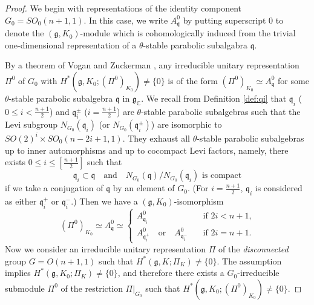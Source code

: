 \begin{proof}
We begin with representations of the identity component
 $G_0=SO_0(n+1,1)$.  
In this case,
 we write $A_{\mathfrak{q}}^0$
 by putting superscript 0
 to denote the $({\mathfrak{g}},K_0)$-module
 which is cohomologically induced from 
 the trivial one-dimensional representation
 of a $\theta$-stable parabolic subalgabra ${\mathfrak{q}}$.  



By a theorem of Vogan and Zuckerman \cite{VZ},
 any irreducible unitary representation $\Pi^0$
 of $G_0$ 
 with $H^{\ast}({\mathfrak{g}},K_0;(\Pi^0)_{K_0}) \ne \{0\}$
 is of the form
 $(\Pi^0)_{K_0} \simeq A_{\mathfrak{q}}^0$
 for some $\theta$-stable parabolic subalgebra 
 ${\mathfrak{q}}$ in ${\mathfrak {g}}_{\mathbb{C}}$.  
We recall from Definition \ref{def:qi}
 that ${\mathfrak{q}}_i$
 ($0 \le i < \frac{n+1}{2}$)
 and ${\mathfrak{q}}_i^{\pm}$
 ($i = \frac{n+1}{2}$)
 are $\theta$-stable parabolic subalgebras
 such that the Levi subgroup 
 $N_{G_0}({\mathfrak{q}}_i)$
 (or $N_{G_0}({\mathfrak{q}}_i^{\pm})$)
 are isomorphic to 
 $SO(2)^i \times SO_0(n-2i+1,1)$.  
They exhaust all $\theta$-stable parabolic subalgebras 
 up to inner automorphisms
 and up to cocompact Levi factors,
 namely,
 there exists $0 \le i \le [\frac{n+1}{2}]$
 such that 
\[
 {\mathfrak{q}}_i \subset {\mathfrak{q}}
\quad
\text{and}
\quad
  \text{$N_{G_0}({\mathfrak{q}})/N_{G_0}({\mathfrak{q}}_i)$ is compact}
\]
 if we take a conjugation
 of ${\mathfrak{q}}$
 by an element of $G_0$.  
(For $i = \frac{n+1}{2}$, 
 ${\mathfrak{q}}_i$ is considered as either ${\mathfrak{q}}_i^+$
 or ${\mathfrak{q}}_i^-$.)
Then we have a $({\mathfrak{g}},K_0)$-isomorphism
\begin{equation}
\label{eqn:ZVconn}
   (\Pi^0)_{K_0}
   \simeq
   A_{\mathfrak{q}}^0
   \simeq
\begin{cases}
 A_{\mathfrak{q}_i}^0 \quad 
&\text{if $2i < n+1$,}
\\
  A_{\mathfrak{q}_i^+}^0 \quad \text{or}\quad A_{{\mathfrak{q}}_i^-}^0
  \quad 
& \text{if $2i=n+1$.}
\end{cases}
\end{equation}
Now we consider an irreducible unitary representation $\Pi$
 of the {\it{disconnected}} group $G=O(n+1,1)$
 such that 
 $H^{\ast}({\mathfrak{g}},K;\Pi_K) \ne \{0\}$.  
The assumption implies $H^{\ast}({\mathfrak{g}},K_0;\Pi_K) \ne \{0\}$, 
 and therefore there exists a $G_0$-irreducible submodule
 $\Pi^0$ of the restriction $\Pi|_{G_0}$
 such that 
 $H^{\ast}({\mathfrak{g}},K_0;(\Pi^0)_{K_0}) \ne \{0\}$.  

\end{proof}
